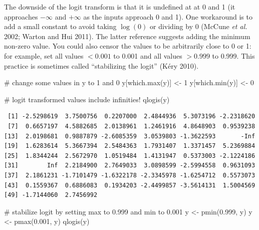 \documentclass[
  13,
  letterpaper,
]{report}
\newenvironment{Shaded}{\begin{snugshade}}{\end{snugshade}}
\newcommand{\CommentTok}[1]{\textcolor[rgb]{0.37,0.37,0.37}{#1}}
\newcommand{\DecValTok}[1]{\textcolor[rgb]{0.68,0.00,0.00}{#1}}
\newcommand{\FloatTok}[1]{\textcolor[rgb]{0.68,0.00,0.00}{#1}}
\newcommand{\FunctionTok}[1]{\textcolor[rgb]{0.28,0.35,0.67}{#1}}
\newcommand{\NormalTok}[1]{\textcolor[rgb]{0.00,0.23,0.31}{#1}}
\newcommand{\OtherTok}[1]{\textcolor[rgb]{0.00,0.23,0.31}{#1}}
\begin{document}
The downside of the logit transform is that it is undefined at at 0 and
1 (it approaches \(-\infty\) and \(+\infty\) as the inputs approach 0
and 1). One workaround is to add a small constant to avoid taking
\(\log{\left(0\right)}\) or dividing by 0 (McCune \emph{et al.} 2002;
Warton and Hui 2011). The latter reference suggests adding the minimum
non-zero value. You could also censor the values to be arbitrarily close
to 0 or 1: for example, set all values \(<0.001\) to 0.001 and all
values \(>0.999\) to 0.999. This practice is sometimes called
``stabilizing the logit'' (Kéry 2010).

\begin{Shaded}
\begin{Highlighting}[]
\CommentTok{\# change some values in y to 1 and 0}
\NormalTok{y[}\FunctionTok{which.max}\NormalTok{(y)] }\OtherTok{\textless{}{-}} \DecValTok{1}
\NormalTok{y[}\FunctionTok{which.min}\NormalTok{(y)] }\OtherTok{\textless{}{-}} \DecValTok{0}

\CommentTok{\# logit transformed values include infinities!}
\FunctionTok{qlogis}\NormalTok{(y)}
\end{Highlighting}
\end{Shaded}

\begin{verbatim}
 [1] -2.5298619  3.7500756  0.2207000  2.4844936  5.3073196 -2.2318620
 [7]  0.6657197  4.5882685  2.0138961  1.2461916  4.8648903  0.9539238
[13]  2.0198681  0.9887879 -2.6085359  3.0539803 -1.3622593       -Inf
[19]  1.6283614  5.3667394  2.5484363  1.7931407  1.3371457  5.2369884
[25]  1.8344244  2.5672970  1.0519484  1.4131947  0.5373003 -2.1224186
[31]        Inf  2.2184900  2.7649033  3.0898599 -2.5994558  0.9631093
[37]  2.1861231 -1.7101479 -1.6322178 -2.3345978 -1.6254712  0.5573073
[43]  0.1559367  0.6886083  0.1934203 -2.4499857 -3.5614131  1.5004569
[49] -1.7144060  2.7456992
\end{verbatim}

\begin{Shaded}
\begin{Highlighting}[]
\CommentTok{\# stabilize logit by setting max to 0.999 and min to 0.001}
\NormalTok{y }\OtherTok{\textless{}{-}} \FunctionTok{pmin}\NormalTok{(}\FloatTok{0.999}\NormalTok{, y)}
\NormalTok{y }\OtherTok{\textless{}{-}} \FunctionTok{pmax}\NormalTok{(}\FloatTok{0.001}\NormalTok{, y)}
\FunctionTok{qlogis}\NormalTok{(y)}
\end{Highlighting}
\end{Shaded}
\end{document}
